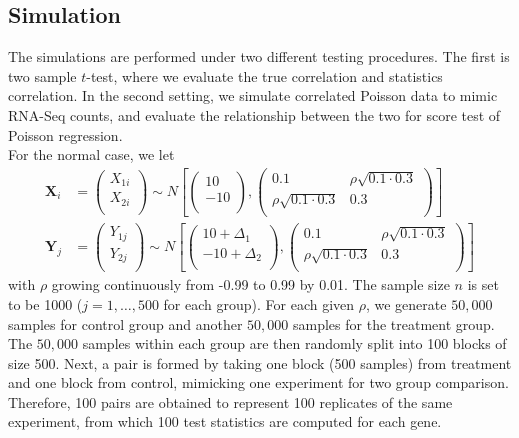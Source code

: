 \documentclass[12pt, a4paper]{article}
\begin{document}
	
	
	\subsection{Simulation}
	The simulations are performed under two different testing procedures. The first is two sample
	$t$-test, where we evaluate the true correlation and statistics correlation.  In the second setting,
	we simulate correlated Poisson data to mimic RNA-Seq counts, and evaluate the relationship between
	the two for score test of Poisson regression. \\
	
	For the normal case, we let 
	\begin{equation}
		\begin{aligned}
			\bm X_i &=\left( \begin{array}{c}
				X_{1i}\\
				X_{2i}\\
			\end{array}\right)
			\sim N\left[
			\left(\begin{array}{c}
				10\\
				-10\\
			\end{array} \right), 
			\left(
			\begin{array}{cc}
				0.1 &\rho \sqrt{0.1\cdot 0.3} \\
				\rho \sqrt{0.1\cdot 0.3} & 	0.3 \\
			\end{array}
			\right)
			\right] \\
			\bm Y_j &= \left( \begin{array}{c}
				Y_{1j}\\
				Y_{2j}\\
			\end{array}\right)
			\sim N\left[
			\left(\begin{array}{c}
				10+ \Delta_1\\
				-10 + \Delta_2\\
			\end{array} \right), 
			\left(
			\begin{array}{cc}
				0.1 &\rho \sqrt{0.1\cdot 0.3} \\
				\rho \sqrt{0.1\cdot 0.3} & 	0.3 \\
			\end{array}
			\right)
			\right] 
		\end{aligned}
	\end{equation}
	with $\rho$ growing continuously from -0.99 to 0.99 by 0.01.  The sample size $n$ is set to be 1000
	($j =1, \ldots, 500$ for each group). For each given $\rho$, we generate $50,000$ samples for
	control group and another $50,000$ samples for the treatment group. The $50,000$ samples within each
	group are then randomly split into 100 blocks of size 500. Next, a pair is formed by taking one
	block (500 samples) from treatment and one block from control,  mimicking one experiment for two
	group comparison. Therefore, 100 pairs are obtained to represent 100 replicates of the same
	experiment, from which 100 test statistics are computed for each gene. 
	
\end{document}
